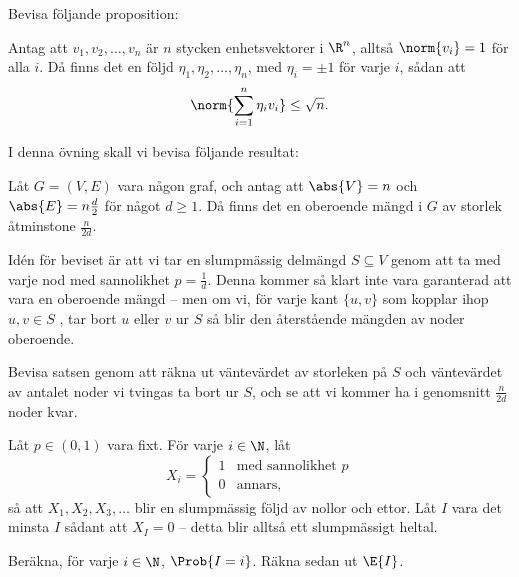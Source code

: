 \documentclass[nobib]{tufte-handout}
\begin{document}
\begin{xca}
    Bevisa följande proposition:

    \begin{proposition}
        Antag att $v_1, v_2, \ldots, v_n$ är $n$ stycken enhetsvektorer i $\R^n$, alltså $\norm{v_i} = 1$ för alla $i$. Då finns det en följd $\eta_1, \eta_2, \ldots, \eta_n$, med $\eta_i = \pm 1$ för varje $i$, sådan att
        $$\norm{\sum_{i=1}^{n} \eta_i v_i} \leq \sqrt{n}.$$
    \end{proposition}
\end{xca}

\begin{xca}
    I denna övning skall vi bevisa följande resultat:

    \begin{theorem}
        Låt $G = (V, E)$ vara någon graf, och antag att $\abs{V} = n$ och $\abs{E} = n\frac{d}{2}$ för något $d \geq 1$. Då finns det en oberoende mängd i $G$ av storlek åtminstone $\frac{n}{2d}$.
    \end{theorem}

    Idén för beviset är att vi tar en slumpmässig delmängd $S \subseteq V$ genom att ta med varje nod med sannolikhet $p = \frac{1}{d}$. Denna kommer så klart inte vara garanterad att vara en oberoende mängd -- men om vi, för varje kant $\{u, v\}$ som kopplar ihop $u, v \in S$ , tar bort $u$ eller $v$ ur $S$ så blir den återstående mängden av noder oberoende.

    Bevisa satsen genom att räkna ut väntevärdet av storleken på $S$ och väntevärdet av antalet noder vi tvingas ta bort ur $S$, och se att vi kommer ha i genomsnitt $\frac{n}{2d}$ noder kvar.
\end{xca}

\begin{xca}
    Låt $p \in (0,1)$ vara fixt. För varje $i \in \N$, låt 
    $$X_i = \begin{cases}
        1  & \text{med sannolikhet }p\\
        0 & \text{annars},
    \end{cases}$$
    så att $X_1, X_2, X_3, \ldots$ blir en slumpmässig följd av nollor och ettor. Låt $I$ vara det minsta $I$ sådant att $X_I = 0$ -- detta blir alltså ett slumpmässigt heltal.

    Beräkna, för varje $i \in \N$, $\Prob{I = i}$. Räkna sedan ut $\E{I}$.
\end{xca}
\end{document}
